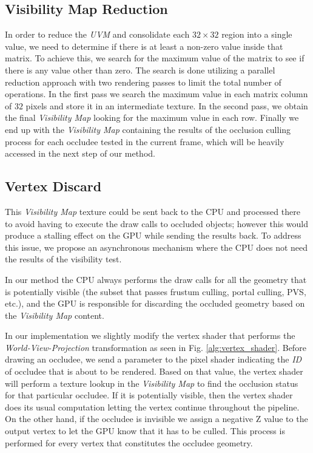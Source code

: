 \documentclass[10pt, conference]{IEEEtran}
\begin{document}
\subsection{Visibility Map Reduction}
%
In order to reduce the \emph{UVM} and consolidate each $32 \times 32$ region into a single value, we need to determine if there is at least a non-zero value inside that matrix. 
To achieve this, we search for the maximum value of the matrix to see if there is any value other than zero. 
The search is done utilizing a parallel reduction approach with two rendering passes to limit the total number of operations. 
In the first pass we search the maximum value in each matrix column of $32$ pixels and store it in an intermediate texture. 
In the second pass, we obtain the final \emph{Visibility Map} looking for the maximum value in each row. 
Finally we end up with the \emph{Visibility Map} containing the results of the occlusion culling process for each occludee tested in the current frame, which will be heavily accessed in the next step of our method. 


\subsection{Vertex Discard}
%
This \emph{Visibility Map} texture could be sent back to the CPU and processed there to avoid having to execute the draw calls to occluded objects; 
however this would produce a stalling effect on the GPU while sending the results back. 
To address this issue, we propose an asynchronous mechanism where the CPU does not need the results of the visibility test.\

In our method the CPU always performs the draw calls for all the geometry that is potentially visible 
(the subset that passes frustum culling, portal culling, PVS, etc.), and the GPU is responsible for discarding the occluded geometry based 
on the \emph{Visibility Map} content.\

In our implementation we slightly modify the vertex shader that performs the \emph{World-View-Projection} transformation as seen in Fig. \ref{alg:vertex_shader}. 
Before drawing an occludee, we send a parameter to the pixel shader indicating the \emph{ID} of occludee that is about to be rendered. 
Based on that value, the vertex shader will perform a texture lookup in the \emph{Visibility Map} to find the occlusion status for that particular occludee. 
If it is potentially visible, then the vertex shader does its usual computation letting the vertex continue throughout the pipeline. 
On the other hand, if the occludee is invisible we assign a negative Z value to the output vertex to let the GPU know that it has to be culled. 
This process is performed for every vertex that constitutes the occludee geometry.
\end{document}
